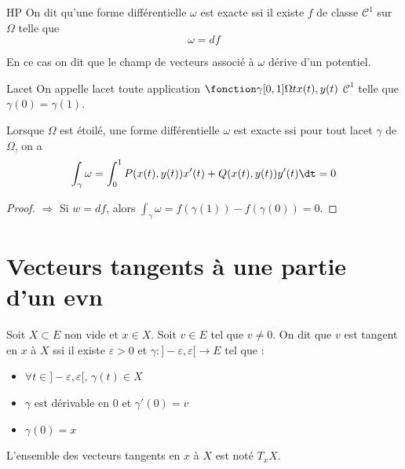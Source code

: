 \begin{definition}{HP}{}
    On dit qu'une forme différentielle $\omega$ est exacte ssi 
    il existe $f$ de classe $\mathscr C^1$ sur $\Omega$ telle que
    $$\omega = df$$

    En ce cas on dit que le champ de vecteurs associé à $\omega$ dérive d'un potentiel.
\end{definition}

\begin{definition}{Lacet}{}
    On appelle lacet toute application $\fonction \gamma {[0, 1]}{\Omega} t {x(t), y(t)}$ $\mathscr C^1$ 
    telle que $\gamma(0) = \gamma(1)$.
\end{definition}

\begin{theoreme}{}{}
    Lorsque $\Omega$ est étoilé, une forme différentielle $\omega$ est exacte ssi 
    pour tout lacet $\gamma$ de $\Omega$, on a
    $$\int_\gamma \omega = \int_0^1 P(x(t), y(t)) x'(t) + Q(x(t), y(t)) y'(t) \dt = 0$$
\end{theoreme}

\begin{proof}
    $\Rightarrow$ Si $w = df$, alors $\int_\gamma \omega = f(\gamma(1)) - f(\gamma(0)) = 0$.
\end{proof}


\section{Vecteurs tangents à une partie d'un evn}



\begin{definition}{}{}
    Soit $X \subset E$ non vide et $x \in X$. Soit $v \in E$ tel que 
    $v \neq 0$. On dit que $v$ est tangent en $x$ à $X$ ssi il existe $\varepsilon > 0$ 
    et $\gamma : ]- \varepsilon, \varepsilon[ \to E$ tel que : 
    \begin{itemize}
        \item $\forall t \in ]- \varepsilon, \varepsilon[, \, \gamma(t) \in X$
        \item $\gamma$ est dérivable en $0$ et $\gamma'(0) = v$
        \item $\gamma(0) = x$
    \end{itemize}

    L'ensemble des vecteurs tangents en $x$ à $X$ est noté $T_xX$. 
\end{definition}

